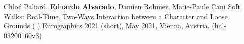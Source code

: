 \begin{cventries}
\cvpublication
    {Chlo{\'{e}} Paliard, \textbf{\underline{Eduardo Alvarado}}, Damien Rohmer, Marie-Paule Cani} %
    {\href{https://edualvarado.com/soft-walks/}{Soft {Walks}: {Real}-{Time}, {Two}-{Ways} {Interaction} between a {Character} and {Loose} {Grounds}} (\href{https://github.com/edualvarado/unity-soft-walks}{} \href{https://hal.inria.fr/hal-03200160/}{} \href{https://www.youtube.com/watch?v=76eIChGWUGw}{})} %
    {Eurographics 2021 (short), May 2021, Vienna, Austria. (hal-03200160v3)} %
    
\end{cventries}
